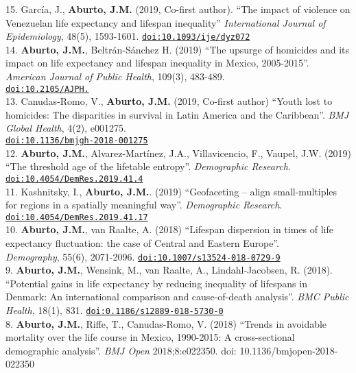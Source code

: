 \documentclass[12pt]{article}
\providecommand*\url[1]{\href{#1}{#1}}
\renewcommand*\url[1]{\href{#1}{\texttt{#1}}}
\begin{document}
15. Garc\'ia, J., \textbf{Aburto, J.M.} (2019, Co-first author). ``The impact of violence on Venezuelan life expectancy and lifespan inequality''  \textit{International Journal of Epidemiology}, 48(5), 1593-1601. \url{doi:10.1093/ije/dyz072}\\

14. \textbf{Aburto, J.M.}, Beltr\'an-S\'anchez H. (2019) ``The upsurge of homicides and its impact on life expectancy and lifespan inequality in Mexico, 2005-2015''. \textit{ American Journal of Public Health}, 109(3), 483-489. \\ \url{doi:10.2105/AJPH.}\\

13. Canudas-Romo, V., \textbf{Aburto, J.M.} (2019, Co-first author) ``Youth lost to homicides: The disparities in survival in Latin America and the Caribbean''. \textit{BMJ Global Health}, 4(2), e001275. \\ \url{doi:10.1136/bmjgh-2018-001275}\\

12. \textbf{Aburto, J.M.}, Alvarez-Mart\'inez, J.A., Villavicencio, F., Vaupel, J.W. (2019) ``The threshold age of the lifetable entropy''.  \textit{Demographic Research}. \url{doi:10.4054/DemRes.2019.41.4}\\

11. Kashnitsky, I., \textbf{Aburto, J.M.}. (2019) ``Geofaceting – align small-multiples for regions in a spatially meaningful way''. \textit{Demographic Research}. \url{doi:10.4054/DemRes.2019.41.17}\\

10. \textbf{Aburto, J.M.}, van Raalte, A. (2018) ``Lifespan dispersion in times of life expectancy fluctuation: the case of Central and Eastern Europe''.\\ \textit{Demography}, 55(6), 2071-2096. \url{doi:10.1007/s13524-018-0729-9} \\

9. \textbf{Aburto, J.M.}, Wensink, M., van Raalte, A., Lindahl-Jacobsen, R. (2018). ``Potential gains in life expectancy by reducing inequality of lifespans in Denmark: An international comparison and cause-of-death analysis''. \emph{BMC Public Health}, 18(1), 831. \url{doi:0.1186/s12889-018-5730-0} \\

8. \textbf{Aburto, J.M.}, Riffe, T., Canudas-Romo, V. (2018) ``Trends in avoidable mortality over the life course in Mexico, 1990-2015:  A cross-sectional demographic analysis''. \emph{BMJ Open} 2018;8:e022350. doi: 10.1136/bmjopen-2018-022350 \\
\end{document}
